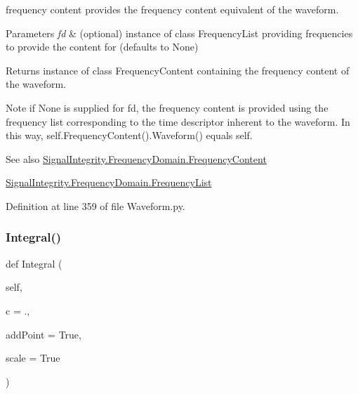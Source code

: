frequency content provides the frequency content equivalent of the waveform. 


\begin{DoxyParams}{Parameters}
{\em fd} & (optional) instance of class Frequency\+List providing frequencies to provide the content for (defaults to None) \\
\hline
\end{DoxyParams}
\begin{DoxyReturn}{Returns}
instance of class Frequency\+Content containing the frequency content of the waveform. 
\end{DoxyReturn}
\begin{DoxyNote}{Note}
if None is supplied for fd, the frequency content is provided using the frequency list corresponding to the time descriptor inherent to the waveform. In this way, self.\+Frequency\+Content().Waveform() equals self. 
\end{DoxyNote}
\begin{DoxySeeAlso}{See also}
\hyperlink{namespaceSignalIntegrity_1_1FrequencyDomain_1_1FrequencyContent}{Signal\+Integrity.\+Frequency\+Domain.\+Frequency\+Content} 

\hyperlink{namespaceSignalIntegrity_1_1FrequencyDomain_1_1FrequencyList}{Signal\+Integrity.\+Frequency\+Domain.\+Frequency\+List} 
\end{DoxySeeAlso}


Definition at line 359 of file Waveform.\+py.

\mbox{\label{classSignalIntegrity_1_1TimeDomain_1_1Waveform_1_1Waveform_1_1Waveform_a47667b6657a67800a3a94d6cc492bdaa}} 
\subsubsection{\texorpdfstring{Integral()}{Integral()}}
{\footnotesize\ttfamily def Integral (\begin{DoxyParamCaption}\item[{}]{self,  }\item[{}]{c = {.},  }\item[{}]{add\+Point = {\ttfamily True},  }\item[{}]{scale = {\ttfamily True} }\end{DoxyParamCaption})}



